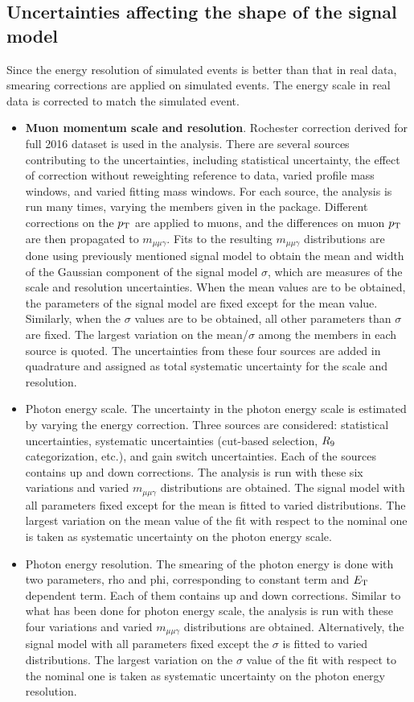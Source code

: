 		\subsection*{Uncertainties affecting the shape of the signal model}
		Since the energy resolution of simulated events is better than that in real data, smearing corrections are applied on simulated events. The energy scale in real data is corrected to match the simulated event.
		\begin{itemize}
		\item \textbf{Muon momentum scale and resolution}. Rochester correction derived for full 2016 dataset is used in the analysis. There are several sources contributing to the uncertainties, including statistical uncertainty, the effect of correction without reweighting reference to data, varied profile mass windows, and varied fitting mass windows. For each source, the analysis is run many times, varying the members given in the package. Different corrections on the $p_{\mathrm{T}}$ are applied to muons, and the differences on muon $p_{\mathrm{T}}$ are then propagated to $m_{\mu\mu\gamma}$. Fits to the resulting $m_{\mu\mu\gamma}$ distributions are done using previously mentioned signal model to obtain the mean and width of the Gaussian component of the signal model $\sigma$, which are measures of the scale and resolution uncertainties. When the mean values are to be obtained, the parameters of the signal model are fixed except for the mean value. Similarly, when the $\sigma$ values are to be obtained, all other parameters than $\sigma$ are fixed. 
		The largest variation on the mean/$\sigma$ among the members in each source is quoted. The uncertainties from these four sources are added in quadrature and assigned as total systematic uncertainty for the scale and resolution.
		\item Photon energy scale. The uncertainty in the photon energy scale is estimated by varying the energy correction. Three sources are considered: statistical uncertainties, systematic uncertainties (cut-based selection, $R_\mathrm{9}$ categorization, etc.), and gain switch uncertainties. Each of the sources contains up and down corrections. The analysis is run with these six variations and varied $m_{\mu\mu\gamma}$ distributions are obtained. The signal model with all parameters fixed except for the mean is fitted to varied distributions. The largest variation on the mean value of the fit with respect to the nominal one is taken as systematic uncertainty on the photon energy scale.
		\item Photon energy resolution. The smearing of the photon energy is done with two parameters, rho and phi, corresponding to constant term and $E_{\mathrm{T}}$ dependent term. Each of them contains up and down corrections. Similar to what has been done for photon energy scale, the analysis is run with these four variations and varied $m_{\mu\mu\gamma}$ distributions are obtained. Alternatively, the signal model with all parameters fixed except the $\sigma$ is fitted to varied distributions. The largest variation on the $\sigma$ value of the fit with respect to the nominal one is taken as systematic uncertainty on the photon energy resolution.
		\end{itemize}
		
